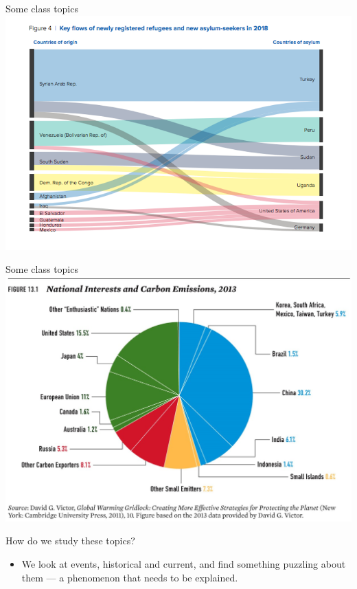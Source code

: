 \documentclass{beamer}
\begin{document}
\begin{frame}{\LARGE Some class topics} %
	\includegraphics[width=\textwidth]{refugee flows.png}
\end{frame}

\begin{frame}{\LARGE Some class topics}
\centering
\includegraphics[width=\textwidth,height=0.8\textheight,keepaspectratio]{environment and national interests.jpg}
\end{frame}

\begin{frame}{\LARGE How do we study these topics?}
\begin{itemize}
    \item We look at events, historical and current, and find something puzzling about them --- a phenomenon that needs to be explained.
\end{itemize}
\end{frame}
\end{document}
